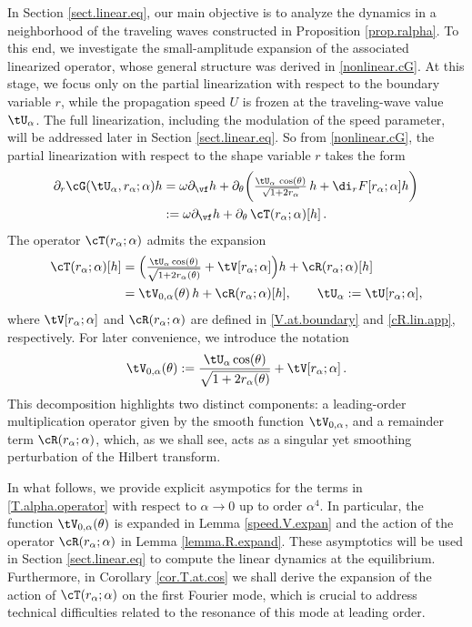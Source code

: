 \documentclass[a4paper,reqno,10pt]{article}
\newcommand{\pa}{\partial}
\begin{document}
In Section \ref{sect.linear.eq}, our main objective is to analyze the dynamics in a neighborhood of the traveling waves constructed in Proposition \ref{prop.ralpha}. To this end, we investigate the small-amplitude expansion of the associated linearized operator, whose general structure was derived in \eqref{nonlinear.cG}. 
At this stage, we focus only on the partial linearization with respect to the boundary variable \(r\), while the propagation speed \(U\) is frozen at the traveling-wave value \(\tU_{\alpha}\). The full linearization, including the modulation of the speed parameter, will be addressed later in Section \ref{sect.linear.eq}. 
So from \eqref{nonlinear.cG}, the partial linearization with respect to the shape variable $r$ takes the form  
\begin{align}\label{nonlinear.cGL}
\partial_{r}\cG(\tU_\alpha,{r}_\alpha;\alpha)h
   &= \omega \pa_{\vf} h 
   + \pa_{\theta} \bigg(  \tfrac{\tU_{\alpha}\,\cos(\theta)}{\sqrt{1+2 {r}_\alpha}} \, h 
   + \di_{r}  F[ r_\alpha; \alpha] h \bigg) \\
   &:= \omega \pa_{\vf} h + \pa_{\theta}\,\cT(r_\alpha;\alpha)[h] \,.
\end{align}
The operator \(\cT(r_\alpha;\alpha)\) admits the expansion  
\begin{align}
	\cT(r_\alpha;\alpha)[h] 
		&= \Big( \tfrac{\tU_{\alpha} \cos(\theta)}{\sqrt{1+2r_\alpha(\theta)}} 
               + \tV[r_\alpha;\alpha]  \Big)h 
               +  \cR(r_\alpha;\alpha)[h] \\
        &= \tV_{0,\alpha}(\theta)\,h + \cR(r_\alpha;\alpha)[h], 
        \qquad \tU_{\alpha}:=\tU[r_\alpha;\alpha],	\label{T.alpha.operator}
\end{align}
where \(\tV[r_\alpha;\alpha]\) and \(\cR(r_\alpha;\alpha)\) are defined in \eqref{V.at.boundary} and \eqref{cR.lin.app}, respectively.  For later convenience, we introduce the notation
\begin{equation}\label{wttV}
	\tV_{0,\alpha}(\theta) := \frac{\tU_{\alpha} \cos(\theta)}{\sqrt{1+2r_\alpha(\theta)}} + \tV[r_\alpha;\alpha] \,.
\end{equation}
This decomposition highlights two distinct components:  a leading-order multiplication operator given by the smooth function \(\tV_{0,\alpha}\),  
and a remainder term \(\cR(r_\alpha;\alpha)\), which, as we shall see, acts as a singular yet smoothing perturbation of the Hilbert transform.  

In what follows, we provide explicit asympotics for the terms in \eqref{T.alpha.operator} with respect to $\alpha\to 0$ up to order $\alpha^4$. In particular, the function $\tV_{0,\alpha}(\theta)$ is expanded in Lemma \ref{speed.V.expan} and the action of the operator $\cR(r_\alpha;\alpha)$ in Lemma \ref{lemma.R.expand}. These asymptotics will be used in Section \ref{sect.linear.eq} to compute the linear dynamics at the equilibrium. Furthermore, in Corollary \ref{cor.T.at.cos} we shall derive the expansion of the action of \(\cT(r_\alpha;\alpha)\) on the first Fourier mode, which is crucial to address technical difficulties related to the resonance of this mode at leading order.  
\end{document}
